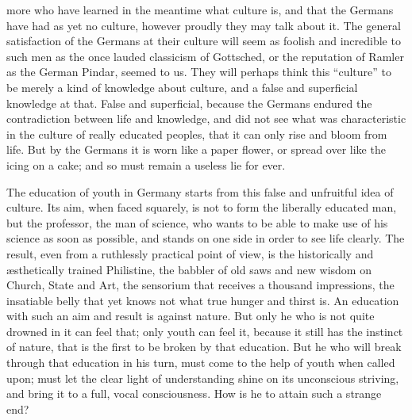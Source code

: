 more who have learned in the meantime what culture is, and that the
Germans have had as yet no culture, however proudly they may talk
about it. The general satisfaction of the Germans at their culture
will seem as foolish and incredible to such men as the once lauded
classicism of Gottsched, or the reputation of Ramler as the German
Pindar, seemed to us. They will perhaps think this \enquote{culture} to be
merely a kind of knowledge about culture, and a false and superficial
knowledge at that. False and superficial, because the Germans endured
the contradiction between life and knowledge, and did not see what
was characteristic in the culture of really educated peoples, that it
can only rise and bloom from life. But by the Germans it is worn like
a paper flower, or spread over like the icing on a cake; and so must
remain a useless lie for ever.

The education of youth in Germany starts from this false and
unfruitful idea of culture. Its aim, when faced squarely, is not to
form the liberally educated man, but the professor, the man of
science, who wants to be able to make use of his science as soon as
possible, and stands on one side in order to see life clearly. The
result, even from a ruthlessly practical point of view, is the
historically and æsthetically trained Philistine, the babbler of old
saws and new wisdom on Church, State and Art, the sensorium that
receives a thousand impressions, the insatiable belly that yet knows
not what true hunger and thirst is. An education with such an aim and
result is against nature. But only he who is not quite drowned in it
can feel that; only youth can feel it, because it still has the
instinct of nature, that is the first to be broken by that education.
But he who will break through that education in his turn, must come
to the help of youth when called upon; must let the clear light of
understanding shine on its unconscious striving, and bring it to a
full, vocal consciousness. How is he to attain such a strange end?

